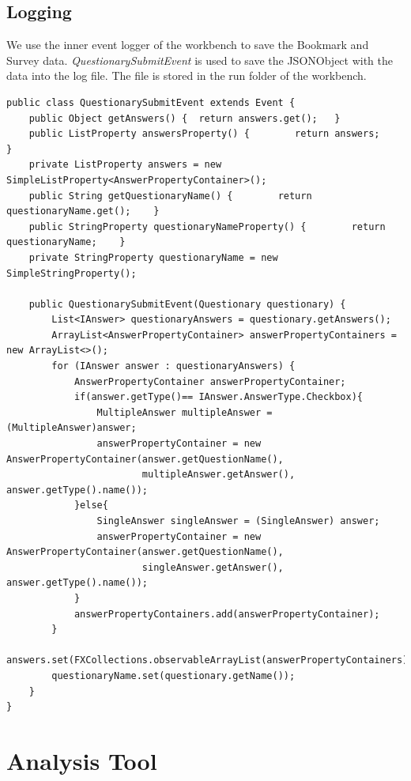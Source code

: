 \subsection{Logging}\label{subsec:logging}

We use the inner event logger of the  workbench to save the Bookmark and Survey data. \textit{QuestionarySubmitEvent} is used to save the JSONObject with the data into the log file. The file is stored in the run folder of the workbench.\\
\lstset{language=Java} 
\begin{lstlisting}
public class QuestionarySubmitEvent extends Event {
    public Object getAnswers() {  return answers.get();   }
    public ListProperty answersProperty() {        return answers;    }
    private ListProperty answers = new SimpleListProperty<AnswerPropertyContainer>();
    public String getQuestionaryName() {        return questionaryName.get();    }
    public StringProperty questionaryNameProperty() {        return questionaryName;    }
    private StringProperty questionaryName = new SimpleStringProperty();

    public QuestionarySubmitEvent(Questionary questionary) {
        List<IAnswer> questionaryAnswers = questionary.getAnswers();
        ArrayList<AnswerPropertyContainer> answerPropertyContainers = new ArrayList<>();
        for (IAnswer answer : questionaryAnswers) {
            AnswerPropertyContainer answerPropertyContainer;
            if(answer.getType()== IAnswer.AnswerType.Checkbox){
                MultipleAnswer multipleAnswer = (MultipleAnswer)answer;
                answerPropertyContainer = new AnswerPropertyContainer(answer.getQuestionName(),
                        multipleAnswer.getAnswer(), answer.getType().name());
            }else{
                SingleAnswer singleAnswer = (SingleAnswer) answer;
                answerPropertyContainer = new AnswerPropertyContainer(answer.getQuestionName(),
                        singleAnswer.getAnswer(), answer.getType().name());
            }
            answerPropertyContainers.add(answerPropertyContainer);
        }
        answers.set(FXCollections.observableArrayList(answerPropertyContainers));
        questionaryName.set(questionary.getName());
    }
}
\end{lstlisting}

\section{Analysis Tool}\label{section:analysisTool}

